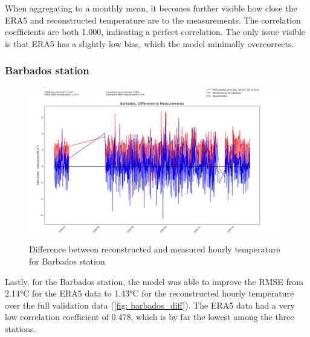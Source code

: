 When aggregating to a monthly mean, it becomes further visible how close the ERA5 and reconstructed temperature are to the measurements. The correlation coefficients are both 1.000, indicating a perfect correlation.
The only issue visible is that ERA5 has a slightly low bias, which the model minimally overcorrects.

\subsubsection*{Barbados station}

\begin{figure}
    \centering
    \includegraphics[width=1.00\textwidth]{resources/images/charts/barbados_eval_grib_final/Barbados, Difference to Measurements.png}
    \caption{Difference between reconstructed and measured hourly temperature for Barbados station}
    \label{fig: barbados_diff}
\end{figure}

Lastly, for the Barbados station, the model was able to improve the RMSE from 2.14°C for the ERA5 data to 1.43°C for the reconstructed hourly temperature over the full validation data (\autoref{fig: barbados_diff}).
The ERA5 data had a very low correlation coefficient of 0.478, which is by far the lowest among the three stations.

